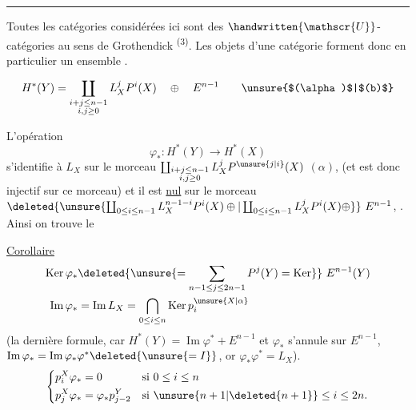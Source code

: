 \noindent\rule{\linewidth}{0.4pt}

\handwritten{\textsuperscript{$(*)$}} Toutes les catégories considérées ici sont des $\handwritten{\mathscr{U}}$-catégories au sens de Grothendick \textsuperscript{(3)}. Les objets d'une catégorie forment donc en particulier un ensemble .

\[
 H^*(Y)=\coprod_{\substack{i+j\leq n-1\\i,j\geq0}}L_X^jP^i(X)\quad\oplus\quad E^{n-1}\tag*{\unsure{$(\alpha)$|$(b)$}}
\]

L'opération
\[
\varphi_*:H^*(Y)\longrightarrow H^*(X)
\]
s'identifie  à $L_X$ sur le morceau $\coprod_{\substack{i+j\leq n-1\\i,j\geq0}}L_X^jP^{\unsure{j|i}}(X)$  $(\alpha)$, (et est  donc injectif sur ce morceau) et il est \uline{nul} sur le morceau $\deleted{\unsure{\coprod_{0\leq i\leq n-1} L_X^{n-1-i}P^i(X)\oplus|\coprod_{0\leq i\leq n-1}L_X^jP^i(X)\oplus}}\ E^{n-1}$, . Ainsi on trouve le

\uline{Corollaire}
\[
\begin{aligned}
\operatorname{Ker}\varphi_* &\deleted{\unsure{=\sum_{n-1\leq j\leq2n-1}P^j(Y)=\operatorname{Ker}}}\ E^{n-1}(Y)\\
\operatorname{Im}\varphi_* &=\operatorname{Im} L_X=\bigcap_{0\leq i\leq n}\operatorname{Ker}p_i^{\unsure{X|\alpha}}
\end{aligned}
\]
(la dernière formule, car $H^*(Y)=\operatorname{Im}\varphi^*+E^{n-1}$ et $\varphi_*$ s'annule sur $E^{n-1}$,  $\operatorname{Im}\varphi_*=\operatorname{Im}\varphi_*\varphi^*\deleted{\unsure{=I}}$, or $\varphi_*\varphi^*=L_X$).
\[
\left\{\begin{aligned}
p_i^X\varphi_*&=0&&\text{si }0\leq i\leq n\\
p_j^X\varphi_*&=\varphi_*p_{j-2}^Y&&\text{si }\unsure{n+1|\deleted{n+1}}\leq i\leq 2n.
\end{aligned}\right.
\]

